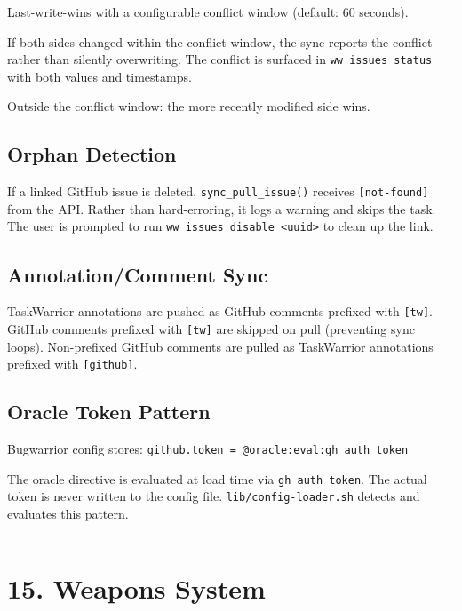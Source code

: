 \documentclass[
]{article}
\begin{document}
Last-write-wins with a configurable conflict window (default: 60
seconds).

If both sides changed within the conflict window, the sync reports the
conflict rather than silently overwriting. The conflict is surfaced in
\texttt{ww\ issues\ status} with both values and timestamps.

Outside the conflict window: the more recently modified side wins.

\subsection{Orphan Detection}\label{orphan-detection}

If a linked GitHub issue is deleted, \texttt{sync\_pull\_issue()}
receives \texttt{{[}not-found{]}} from the API. Rather than
hard-erroring, it logs a warning and skips the task. The user is
prompted to run
\texttt{ww\ issues\ disable\ \textless{}uuid\textgreater{}} to clean up
the link.

\subsection{Annotation/Comment Sync}\label{annotationcomment-sync}

TaskWarrior annotations are pushed as GitHub comments prefixed with
\texttt{{[}tw{]}}. GitHub comments prefixed with \texttt{{[}tw{]}} are
skipped on pull (preventing sync loops). Non-prefixed GitHub comments
are pulled as TaskWarrior annotations prefixed with
\texttt{{[}github{]}}.

\subsection{Oracle Token Pattern}\label{oracle-token-pattern}

Bugwarrior config stores:
\texttt{github.token\ =\ @oracle:eval:gh\ auth\ token}

The oracle directive is evaluated at load time via
\texttt{gh\ auth\ token}. The actual token is never written to the
config file. \texttt{lib/config-loader.sh} detects and evaluates this
pattern.

\begin{center}\rule{0.5\linewidth}{0.5pt}\end{center}

\section{15. Weapons System}\label{weapons-system}
\end{document}
